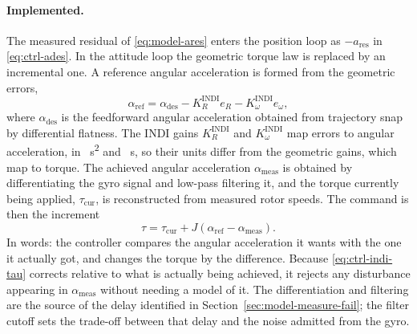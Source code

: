 \paragraph{Implemented.} The measured residual of \eqref{eq:model-ares} enters the position loop as
$-a_{\mathrm{res}}$ in \eqref{eq:ctrl-ades}. In the attitude loop the geometric torque law is
replaced by an incremental one. A reference angular acceleration is formed from the geometric
errors,
%
\begin{equation}
  \alpha_{\mathrm{ref}} = \alpha_{\mathrm{des}} - K_R^{\mathrm{INDI}} e_R - K_\omega^{\mathrm{INDI}} e_\omega,
  \label{eq:ctrl-alpharef}
\end{equation}
%
where $\alpha_{\mathrm{des}}$ is the feedforward angular acceleration obtained from trajectory snap
by differential flatness. The INDI gains $K_R^{\mathrm{INDI}}$ and $K_\omega^{\mathrm{INDI}}$ map
errors to angular acceleration, in \si{\per\second\squared} and \si{\per\second}, so their units
differ from the geometric gains, which map to torque. The achieved angular acceleration $\alpha_{\mathrm{meas}}$ is obtained by
differentiating the gyro signal and low-pass filtering it, and the torque currently being applied,
$\tau_{\mathrm{cur}}$, is reconstructed from measured rotor speeds. The command is then the
increment
%
\begin{equation}
  \tau = \tau_{\mathrm{cur}} + J\left(\alpha_{\mathrm{ref}} - \alpha_{\mathrm{meas}}\right).
  \label{eq:ctrl-indi-tau}
\end{equation}
%
In words: the controller compares the angular acceleration it wants with the one it actually got, and
changes the torque by the difference. Because \eqref{eq:ctrl-indi-tau} corrects relative to what is actually being achieved, it rejects
any disturbance appearing in $\alpha_{\mathrm{meas}}$ without needing a model of it. The
differentiation and filtering are the source of the delay identified in
Section~\ref{sec:model-measure-fail}; the filter cutoff sets the trade-off between that delay and
the noise admitted from the gyro.

